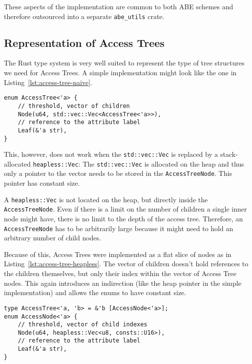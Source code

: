 These aspects of the implementation are common to both ABE schemes and therefore outsourced into a separate \verb+abe_utils+ crate.

\subsection{Representation of Access Trees}
The Rust type system is very well suited to represent the type of tree structures we need for Access Trees.
A simple implementation might look like the one in Listing~\ref{lst:access-tree-naive}. 

\begin{lstlisting}[float=h,caption={Simple Implementation of Access Trees (using the standard library)},label={lst:access-tree-naive}]
enum AccessTree<'a> {
    // threshold, vector of children
    Node(u64, std::vec::Vec<AccessTree<'a>>),
    // reference to the attribute label
    Leaf(&'a str),
}
\end{lstlisting}

This, however, does not work when the \texttt{std::vec::Vec} is replaced by a stack-allocated \texttt{heapless::Vec}:
The \texttt{std::vec::Vec} is allocated on the heap and thus only a pointer to the vector needs to be stored in the \texttt{AccessTreeNode}.
This pointer has constant size.

A \texttt{heapless::Vec} is not located on the heap, but directly inside the \texttt{AccessTreeNode}.
Even if there is a limit on the number of children a single inner node might have, there is no limit to the depth of the access tree.
Therefore, an \texttt{AccessTreeNode} has to be arbitrarily large because it might need to hold an arbitrary number of child nodes.

Because of this, Access Trees were implemented as a flat slice of nodes as in Listing~\ref{lst:access-tree-heapless}. 
The vector of children doesn't hold references to the children themselves, but only their index within the vector of Access Tree nodes.
This again introduces an indirection (like the heap pointer in the simple implementation) and allows the enums to have constant size.

\begin{lstlisting}[float=h,caption={Refined implementation of Access Trees (works without standard library)},label={lst:access-tree-heapless}]
type AccessTree<'a, 'b> = &'b [AccessNode<'a>];
enum AccessNode<'a> {
    // threshold, vector of child indexes
    Node(u64, heapless::Vec<u8, consts::U16>),
    // reference to the attribute label
    Leaf(&'a str),
}
\end{lstlisting}

